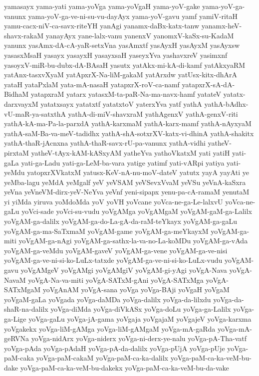 {yamasayx
yama-yati
yama-yoVga
yama-yoVgaH
yama-yoV-gake
yama-yoV-ga-vanunx
yama-yoV-ga-ve-ni-su-vu-dayAyx
yama-yoV-gavu
yamf
yamiV-ritaH
yamu-cacx-niV-ca-savx-riteYH
yanAgi
yanamx-daBx-katx-tanw
yanamx-heV-shavx-rakaM
yanayAyx
yane-lalx-vanu
yanenxV
yanomxV-kaSx-su-KadaM
yanunx
yasAmx-dA-cA-yaR-setxVna
yasAmxtf
yasAyxH
yasAyxM
yasAyxsw
yasasxMsaH
yasayx
yasayxH
yasayxsaH
yaseyxYva
yashavxreV
yasimxnf
yasoyxV-miR-bu-dubx-dA-BAsaH
yasutx
yatAkx-mi-kA-di-kamf
yatAkxyaRM
yatAnx-tasxvXyaM
yatApxrX-Na-liM-gakaM
yatArxdw
yatUsx-kitx-dhArA
yataH
yataPxlaM
yata-mA-nasaH
yatapxrX-roV-ca-namf
yatapxrX-sA-dA-BidhaM
yatapxraM
yatarx
yatasxM-ta-paR-Na-ma-navx-hamf
yatateV
yatatx-darxvayxM
yatatxsayx
yatatxtf
yatatxtoV
yaterxYva
yatf
yathA
yathA-bAdhx-vU-maR-ya-satxthA
yathA-di-miV-shavxraM
yathAgenxV
yathA-genxV-riti
yathA-kA-ma-Pa-la-parxdA
yathA-karxmaM
yathA-karx-mamf
yathA-nAyxyaM
yathA-saM-Ba-va-meV-tadidhx
yathA-shA-sotxrXV-katx-vi-dhinA
yathA-shakitx
yathA-thaR-jAcnxna
yathA-thaR-savx-rU-pa-vanunx
yathA-vidhi
yatheV-pirxtaM
yatheV-tAyx-kAM-kASxyAM
yatheYva
yathoVkatxM
yati
yatiH
yati-gaLa
yati-ga-Ladu
yati-ga-LeM-ba-vara
yatige
yatimf
yati-vARpi
yatiya
yati-yeMdu
yatopxrXVkatxM
yatusx-KeV-nA-nu-moV-dateV
yatutx
yayA
yayAti
ye
yeMba-lagu
yeMdA
yeMgalf
yeV
yeVSAM
yeVSevxVvaM
yeVSu
yeVnA-kaSxra
yeVna
yeVneVM-dirx-yeV-NeYva
yeVnf
yeni-sipapx
yenu-pa-cA-ramaM
yenutaM
yi
yiMda
yiruva
yoMdoMda
yoV
yoVH
yoVcane
yoVca-ne-ga-Le-lalxvU
yoVca-ne-gaLu
yoVci-sade
yoVci-su-vudu
yoVgAMga
yoVgAMgaM
yoVgAM-gaM-ga-Lalilx
yoVgAM-ga-dalilx
yoVgAM-ga-do-La-gA-da-raM-teYkayx
yoVgAM-ga-gaLu
yoVgAM-ga-ma-SaTxmaM
yoVgAM-game
yoVgAM-ga-meYkayxM
yoVgAM-ga-miti
yoVgAM-ga-nAgi
yoVgAM-ga-sathx-la-va-no-La-koMDu
yoVgAM-ga-vAda
yoVgAM-ga-veMdu
yoVgAM-gaveV
yoVgAM-ga-vene
yoVgAM-ga-ve-nisi
yoVgAM-ga-ve-ni-si-ko-LuLx-tatxde
yoVgAM-ga-ve-ni-si-ko-LuLx-vudu
yoVgAM-gavu
yoVgAMgeV
yoVgAMgi
yoVgAMgiV
yoVgAM-gi-yAgi
yoVgA-Nava
yoVgA-NavaM
yoVgA-Na-va-miti
yoVgA-SATxM-gAni
yoVgA-SATxMga
yoVgA-SATxMgaM
yoVgAnAM
yoVgA-sana
yoVga
yoVga-BAji
yoVgaH
yoVgaM
yoVgaM-gaLa
yoVgada
yoVga-daMDa
yoVga-dalilx
yoVga-da-lilxdu
yoVga-da-shaR-na-dalilx
yoVga-diMda
yoVga-diVkASx
yoVga-doLu
yoVga-ga-Lalilx
yoVga-ga-Lige
yoVga-gaLu
yoVga-jA-gama
yoVgaja
yoVgajaM
yoVgajeV
yoVga-karxma
yoVgakekx
yoVga-liM-gAMga
yoVga-liM-gAMgaM
yoVga-mA-gaRda
yoVga-mA-geRVNa
yoVga-nidArx
yoVga-niderx
yoVga-ni-derx-ye-nalu
yoVga-pA-Tha-vatf
yoVga-pAda
yoVga-pAdaH
yoVga-pA-da-dalilx
yoVga-pUjA
yoVga-pUje
yoVga-paM-caka
yoVga-paM-cakaM
yoVga-paM-ca-ka-dalilx
yoVga-paM-ca-ka-veM-bu-dake
yoVga-paM-ca-ka-veM-bu-dakekx
yoVga-paM-ca-ka-veM-bu-da-vake
}

